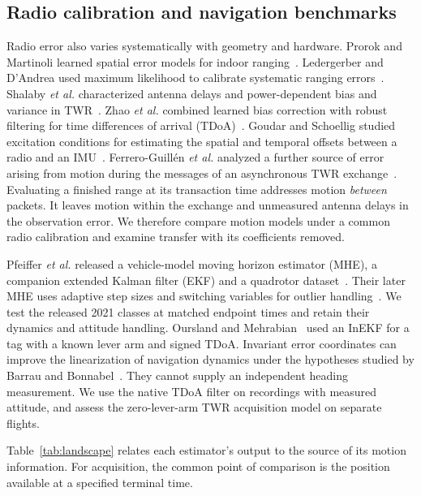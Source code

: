\documentclass{IEEEtaes}
\begin{document}
\subsection{Radio calibration and navigation benchmarks}
Radio error also varies systematically with geometry and hardware. Prorok and Martinoli learned spatial error models for indoor ranging~\cite{prorok}. Ledergerber and D'Andrea used maximum likelihood to calibrate systematic ranging errors~\cite{ledergerber}. Shalaby \emph{et al.} characterized antenna delays and power-dependent bias and variance in TWR~\cite{shalaby}. Zhao \emph{et al.} combined learned bias correction with robust filtering for time differences of arrival (TDoA)~\cite{zhao}. Goudar and Schoellig studied excitation conditions for estimating the spatial and temporal offsets between a radio and an IMU~\cite{goudarcal}. Ferrero-Guill\'en \emph{et al.} analyzed a further source of error arising from motion during the messages of an asynchronous TWR exchange~\cite{motiontwr}. Evaluating a finished range at its transaction time addresses motion \emph{between} packets. It leaves motion within the exchange and unmeasured antenna delays in the observation error. We therefore compare motion models under a common radio calibration and examine transfer with its coefficients removed.

Pfeiffer \emph{et al.} released a vehicle-model moving horizon estimator (MHE), a companion extended Kalman filter (EKF) and a quadrotor dataset~\cite{pfeiffer,delftdata}. Their later MHE uses adaptive step sizes and switching variables for outlier handling~\cite{pfeiffer25}. We test the released 2021 classes at matched endpoint times and retain their dynamics and attitude handling. Oursland and Mehrabian~\cite{oursland} used an InEKF for a tag with a known lever arm and signed TDoA. Invariant error coordinates can improve the linearization of navigation dynamics under the hypotheses studied by Barrau and Bonnabel~\cite{barrau}. They cannot supply an independent heading measurement. We use the native TDoA filter on recordings with measured attitude, and assess the zero-lever-arm TWR acquisition model on separate flights.

Table~\ref{tab:landscape} relates each estimator's output to the source of its motion information. For acquisition, the common point of comparison is the position available at a specified terminal time.
\end{document}
